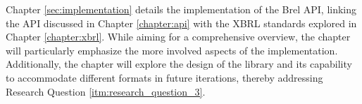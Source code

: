 Chapter \ref{sec:implementation} details the implementation of the Brel API, 
linking the API discussed in Chapter \ref{chapter:api} with the XBRL standards explored in Chapter \ref{chapter:xbrl}.
While aiming for a comprehensive overview,
the chapter will particularly emphasize the more involved aspects of the implementation.
Additionally, the chapter will explore the design of the library and its capability to accommodate different formats in future iterations, 
thereby addressing Research Question \ref{itm:research_question_3}.


